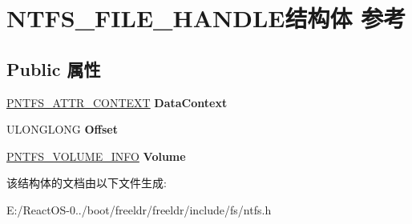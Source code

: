 \hypertarget{struct_n_t_f_s___f_i_l_e___h_a_n_d_l_e}{}\section{N\+T\+F\+S\+\_\+\+F\+I\+L\+E\+\_\+\+H\+A\+N\+D\+L\+E结构体 参考}
\label{struct_n_t_f_s___f_i_l_e___h_a_n_d_l_e}
\subsection*{Public 属性}
\begin{DoxyCompactItemize}
\item 
\mbox{\label{struct_n_t_f_s___f_i_l_e___h_a_n_d_l_e_ae67ffd25ce221fc21a1320a9d1d769fd}} 
\hyperlink{struct_n_t_f_s___a_t_t_r___c_o_n_t_e_x_t}{P\+N\+T\+F\+S\+\_\+\+A\+T\+T\+R\+\_\+\+C\+O\+N\+T\+E\+XT} {\bfseries Data\+Context}
\item 
\mbox{\label{struct_n_t_f_s___f_i_l_e___h_a_n_d_l_e_a936c0bffd56eeec56fac3ce4ec29a97c}} 
U\+L\+O\+N\+G\+L\+O\+NG {\bfseries Offset}
\item 
\mbox{\label{struct_n_t_f_s___f_i_l_e___h_a_n_d_l_e_a1f1211aedd1e95a0011d115e52db6251}} 
\hyperlink{struct___n_t_f_s___v_o_l_u_m_e___i_n_f_o}{P\+N\+T\+F\+S\+\_\+\+V\+O\+L\+U\+M\+E\+\_\+\+I\+N\+FO} {\bfseries Volume}
\end{DoxyCompactItemize}


该结构体的文档由以下文件生成\+:\begin{DoxyCompactItemize}
\item 
E\+:/\+React\+O\+S-\/0../boot/freeldr/freeldr/include/fs/ntfs.\+h\end{DoxyCompactItemize}
